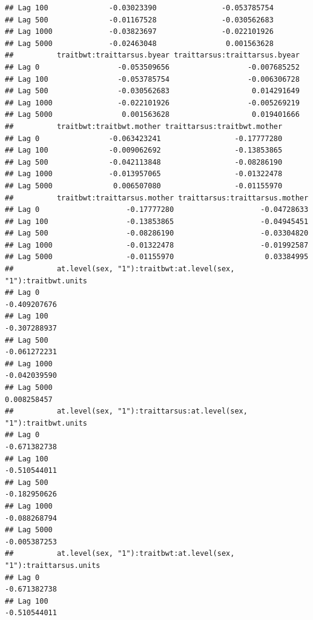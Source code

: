 \documentclass[
  12pt,
]{book}
\begin{document}
\begin{verbatim}
## Lag 100              -0.03023390               -0.053785754
## Lag 500              -0.01167528               -0.030562683
## Lag 1000             -0.03823697               -0.022101926
## Lag 5000             -0.02463048                0.001563628
##          traitbwt:traittarsus.byear traittarsus:traittarsus.byear
## Lag 0                  -0.053509656                  -0.007685252
## Lag 100                -0.053785754                  -0.006306728
## Lag 500                -0.030562683                   0.014291649
## Lag 1000               -0.022101926                  -0.005269219
## Lag 5000                0.001563628                   0.019401666
##          traitbwt:traitbwt.mother traittarsus:traitbwt.mother
## Lag 0                -0.063423241                 -0.17777280
## Lag 100              -0.009062692                 -0.13853865
## Lag 500              -0.042113848                 -0.08286190
## Lag 1000             -0.013957065                 -0.01322478
## Lag 5000              0.006507080                 -0.01155970
##          traitbwt:traittarsus.mother traittarsus:traittarsus.mother
## Lag 0                    -0.17777280                    -0.04728633
## Lag 100                  -0.13853865                    -0.04945451
## Lag 500                  -0.08286190                    -0.03304820
## Lag 1000                 -0.01322478                    -0.01992587
## Lag 5000                 -0.01155970                     0.03384995
##          at.level(sex, "1"):traitbwt:at.level(sex, "1"):traitbwt.units
## Lag 0                                                     -0.409207676
## Lag 100                                                   -0.307288937
## Lag 500                                                   -0.061272231
## Lag 1000                                                  -0.042039590
## Lag 5000                                                   0.008258457
##          at.level(sex, "1"):traittarsus:at.level(sex, "1"):traitbwt.units
## Lag 0                                                        -0.671382738
## Lag 100                                                      -0.510544011
## Lag 500                                                      -0.182950626
## Lag 1000                                                     -0.088268794
## Lag 5000                                                     -0.005387253
##          at.level(sex, "1"):traitbwt:at.level(sex, "1"):traittarsus.units
## Lag 0                                                        -0.671382738
## Lag 100                                                      -0.510544011

\end{verbatim}
\end{document}
